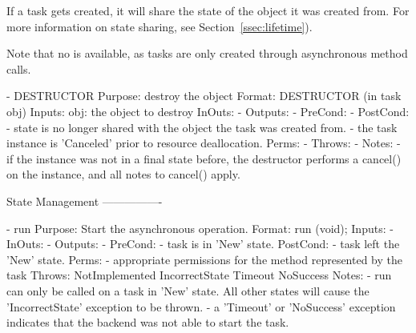     If a task gets created, it will share the state of the
    object it was created from.  For more information on state
    sharing, see Section~\ref{ssec:lifetime}).
    
    Note that no  is available, as tasks
    are only created through asynchronous method calls.
 
 \begin{myspec}
    - DESTRUCTOR
      Purpose:  destroy the object
      Format:   DESTRUCTOR           (in  task obj)
      Inputs:   obj:                  the object to destroy
      InOuts:   -
      Outputs:  -
      PreCond:  -
      PostCond: - state is no longer shared with the object
                  the task was created from.
                - the task instance is 'Canceled' prior to 
                  resource deallocation.
      Perms:    -
      Throws:   -
      Notes:    - if the instance was not in a final state 
                  before, the destructor performs a cancel() 
                  on the instance, and all notes to cancel() 
                  apply.
 
    
    State Management
    ----------------
 
    - run
      Purpose:  Start the asynchronous operation.
      Format:   run (void);
      Inputs:   -
      InOuts:   -
      Outputs:  -
      PreCond:  - task is in 'New' state.
      PostCond: - task left the 'New' state.
      Perms:    - appropriate permissions for the method 
                  represented by the task
      Throws:   NotImplemented
                IncorrectState
                Timeout
                NoSuccess
      Notes:    - run can only be called on a task in 'New' 
                  state.  All other states will cause the 
                  'IncorrectState' exception to be thrown.
                - a 'Timeout' or 'NoSuccess' exception indicates
                  that the backend was not able to start the 
                  task.
 

\end{myspec}
